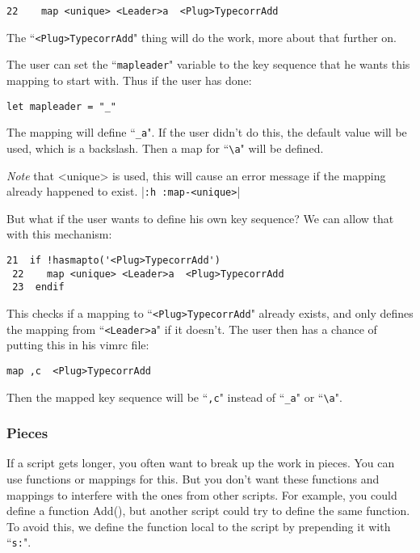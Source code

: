 \begin{Verbatim}[samepage=true]
 22    map <unique> <Leader>a  <Plug>TypecorrAdd
\end{Verbatim}

The ``\texttt{<Plug>TypecorrAdd}" thing will do the work, more about that further on.

The user can set the ``\texttt{mapleader}" variable to the key sequence that he wants this mapping to start with.
Thus if the user has done:

\begin{Verbatim}[samepage=true]
 let mapleader = "_"
\end{Verbatim}

The mapping will define ``\texttt{\_a}".
If the user didn't do this, the default value will be used, which is a backslash.
Then a map for ``\texttt{\textbackslash{}a}" will be defined.

\emph{Note} that <unique> is used, this will cause an error message if the mapping already happened to exist. |\texttt{:h :map-<unique>}|

But what if the user wants to define his own key sequence?
We can allow that with this mechanism:

\begin{Verbatim}[samepage=true]
 21  if !hasmapto('<Plug>TypecorrAdd')
 22    map <unique> <Leader>a  <Plug>TypecorrAdd
 23  endif
\end{Verbatim}

This checks if a mapping to ``\texttt{<Plug>TypecorrAdd}" already exists, and only defines the mapping from ``\texttt{<Leader>a}" if it doesn't.
The user then has a chance of putting this in his vimrc file:

\begin{Verbatim}[samepage=true]
 map ,c  <Plug>TypecorrAdd
\end{Verbatim}

Then the mapped key sequence will be ``\texttt{,c}" instead of ``\texttt{\_a}" or ``\texttt{\textbackslash{}a}".
\subsubsection{Pieces}
If a script gets longer, you often want to break up the work in pieces.
You can use functions or mappings for this.
But you don't want these functions and mappings to interfere with the ones from other scripts.
For example, you could define a function Add(), but another script could try to define the same function.
To avoid this, we define the function local to the script by prepending it with ``\texttt{s:}".


